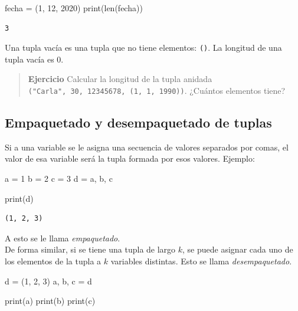 \documentclass[
  letterpaper,
  DIV=11,
  numbers=noendperiod]{scrreprt}
\newenvironment{Shaded}{\begin{snugshade}}{\end{snugshade}}
\newcommand{\BuiltInTok}[1]{\textcolor[rgb]{0.00,0.23,0.31}{#1}}
\newcommand{\DecValTok}[1]{\textcolor[rgb]{0.68,0.00,0.00}{#1}}
\newcommand{\NormalTok}[1]{\textcolor[rgb]{0.00,0.23,0.31}{#1}}
\newcommand{\OperatorTok}[1]{\textcolor[rgb]{0.37,0.37,0.37}{#1}}
\begin{document}
\begin{Shaded}
\begin{Highlighting}[]
\NormalTok{fecha }\OperatorTok{=}\NormalTok{ (}\DecValTok{1}\NormalTok{, }\DecValTok{12}\NormalTok{, }\DecValTok{2020}\NormalTok{)}
\BuiltInTok{print}\NormalTok{(}\BuiltInTok{len}\NormalTok{(fecha))}
\end{Highlighting}
\end{Shaded}

\begin{verbatim}
3
\end{verbatim}

Una tupla vacía es una tupla que no tiene elementos: \texttt{()}. La
longitud de una tupla vacía es 0.

\begin{quote}
\textbf{Ejercicio} Calcular la longitud de la tupla anidada
\texttt{("Carla",\ 30,\ 12345678,\ (1,\ 1,\ 1990))}. ¿Cuántos elementos
tiene?
\end{quote}

\subsection{Empaquetado y desempaquetado de
tuplas}\label{empaquetado-y-desempaquetado-de-tuplas}

Si a una variable se le asigna una secuencia de valores separados por
comas, el valor de esa variable será la tupla formada por esos valores.
Ejemplo:

\begin{Shaded}
\begin{Highlighting}[]
\NormalTok{a }\OperatorTok{=} \DecValTok{1}
\NormalTok{b }\OperatorTok{=} \DecValTok{2}
\NormalTok{c }\OperatorTok{=} \DecValTok{3}
\NormalTok{d }\OperatorTok{=}\NormalTok{ a, b, c}

\BuiltInTok{print}\NormalTok{(d)}
\end{Highlighting}
\end{Shaded}

\begin{verbatim}
(1, 2, 3)
\end{verbatim}

A esto se le llama \emph{empaquetado}.\\

De forma similar, si se tiene una tupla de largo \(k\), se puede asignar
cada uno de los elementos de la tupla a \(k\) variables distintas. Esto
se llama \emph{desempaquetado}.

\begin{Shaded}
\begin{Highlighting}[]
\NormalTok{d }\OperatorTok{=}\NormalTok{ (}\DecValTok{1}\NormalTok{, }\DecValTok{2}\NormalTok{, }\DecValTok{3}\NormalTok{)}
\NormalTok{a, b, c }\OperatorTok{=}\NormalTok{ d}

\BuiltInTok{print}\NormalTok{(a)}
\BuiltInTok{print}\NormalTok{(b)}
\BuiltInTok{print}\NormalTok{(c)}
\end{Highlighting}
\end{Shaded}
\end{document}
